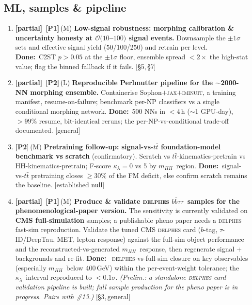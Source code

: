 \documentclass[11pt]{article}
\newcommand{\kl}{\ensuremath{\kappa_\lambda}}
\newcommand{\mhh}{\ensuremath{m_{HH}}}
\newcommand{\bbtt}{\ensuremath{b\bar b\tau\tau}}
\newcommand{\priO}{\textcolor{orange!85!black}{\textbf{[P1]}}}
\newcommand{\priT}{\textcolor{gray!65!black}{\textbf{[P2]}}}
\newcommand{\eff}[1]{{\footnotesize\textcolor{gray!65!black}{(#1)}}}
\newcommand{\sref}[1]{ {\footnotesize\textcolor{gray!60!black}{[#1]}}}
\newcommand{\dw}{\textcolor{green!30!black}{\textbf{Done:}}~}
\newcommand{\stPart}{\textcolor{orange!90!black}{\textbf{[partial]}}}
\begin{document}
\subsection*{ML, samples \& pipeline}
\begin{enumerate}[resume,leftmargin=2.6em]\small
\item \stPart\ \priO\,\eff{M} \textbf{Low-signal robustness: morphing calibration \& uncertainty honesty at
$\mathcal O(10$--$100)$ signal events.} Downsample the $\pm1\sigma$ sets and effective signal yield (50/100/250) and
retrain per level. \dw C2ST $p>0.05$ at the $\pm1\sigma$ floor, ensemble spread $<2\times$ the high-stat value;
flag the binned fallback if it fails. \sref{\S5,\,\S7}
\item \stPart\ \priT\,\eff{L} \textbf{Reproducible Perlmutter pipeline for the $\sim$2000-NN morphing ensemble.}
Containerise Sophon$+$\textsc{jax}$+$\textsc{iminuit}, a training manifest, resume-on-failure; benchmark per-NP
classifiers vs a single conditional morphing network. \dw 500 NNs in $<4$\,h ($\sim$1 GPU-day), $>99\%$ resume,
bit-identical reruns; the per-NP-vs-conditional trade-off documented. \sref{general}
\item \priT\,\eff{M} \textbf{Pretraining follow-up: signal-vs-$t\bar t$ foundation-model benchmark vs scratch}
(confirmatory). Scratch vs $t\bar t$-kinematics-pretrain vs HH-kinematics-pretrain; F-score \kl$=0$ vs 5 by \mhh\
region. \dw signal-vs-$t\bar t$ pretraining closes $\ge30\%$ of the FM deficit, else confirm scratch remains the
baseline. \sref{established null}

\item \stPart\ \priO\,\eff{M} \textbf{Produce \& validate \textsc{delphes} \bbtt\ samples for the
phenomenological-paper version.} The sensitivity is currently validated on \textbf{CMS full-simulation} samples; a
publishable pheno paper needs a \textsc{delphes} fast-sim reproduction. Validate the tuned CMS \textsc{delphes} card
($b$-tag, $\tau$-ID/DeepTau, MET, lepton response) against the full-sim object performance and the
reconstructed-vs-generated \mhh\ response, then regenerate signal $+$ backgrounds and re-fit. \dw
\textsc{delphes}-vs-full-sim closure on key observables (especially \mhh\ below 400\,GeV) within the per-event-weight
tolerance; the \kl\ interval reproduced to $<0.1\sigma$. \textcolor{orange!75!black}{\emph{\small(Prelim.: a
standalone \textsc{delphes} card-validation pipeline is built; full sample production for the pheno paper is in
progress. Pairs with \#13.)}} \sref{\S3,\,general}
\end{enumerate}
\end{document}
